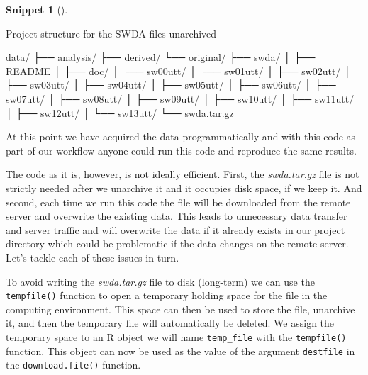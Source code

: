 \documentclass[
  letterpaper,
  krantz1]{latex/krantz-mod}
\newenvironment{Shaded}{\begin{snugshade}}{\end{snugshade}}
\newcommand{\ExtensionTok}[1]{\textcolor[rgb]{0.00,0.00,0.00}{#1}}
\newcommand{\NormalTok}[1]{\textcolor[rgb]{0.00,0.00,0.00}{#1}}
\theoremstyle{definition}
\theoremstyle{definition}
\newtheorem{definition}{Snippet}[chapter]
\theoremstyle{remark}
\begin{document}
\begin{definition}[]\protect\hypertarget{def-acquire-swda-unarchive-location}{}\label{def-acquire-swda-unarchive-location}

Project structure for the SWDA files unarchived

\begin{Shaded}
\begin{Highlighting}[]
\ExtensionTok{data/}
\ExtensionTok{├──}\NormalTok{ analysis/}
\ExtensionTok{├──}\NormalTok{ derived/}
\ExtensionTok{└──}\NormalTok{ original/}
    \ExtensionTok{├──}\NormalTok{ swda/}
    \ExtensionTok{│}\NormalTok{   ├── README}
    \ExtensionTok{│}\NormalTok{   ├── doc/}
    \ExtensionTok{│}\NormalTok{   ├── sw00utt/}
    \ExtensionTok{│}\NormalTok{   ├── sw01utt/}
    \ExtensionTok{│}\NormalTok{   ├── sw02utt/}
    \ExtensionTok{│}\NormalTok{   ├── sw03utt/}
    \ExtensionTok{│}\NormalTok{   ├── sw04utt/}
    \ExtensionTok{│}\NormalTok{   ├── sw05utt/}
    \ExtensionTok{│}\NormalTok{   ├── sw06utt/}
    \ExtensionTok{│}\NormalTok{   ├── sw07utt/}
    \ExtensionTok{│}\NormalTok{   ├── sw08utt/}
    \ExtensionTok{│}\NormalTok{   ├── sw09utt/}
    \ExtensionTok{│}\NormalTok{   ├── sw10utt/}
    \ExtensionTok{│}\NormalTok{   ├── sw11utt/}
    \ExtensionTok{│}\NormalTok{   ├── sw12utt/}
    \ExtensionTok{│}\NormalTok{   └── sw13utt/}
    \ExtensionTok{└──}\NormalTok{ swda.tar.gz}
\end{Highlighting}
\end{Shaded}

\end{definition}

At this point we have acquired the data programmatically and with this
code as part of our workflow anyone could run this code and reproduce
the same results.

The code as it is, however, is not ideally efficient. First, the
\emph{swda.tar.gz} file is not strictly needed after we unarchive it and
it occupies disk space, if we keep it. And second, each time we run this
code the file will be downloaded from the remote server and overwrite
the existing data. This leads to unnecessary data transfer and server
traffic and will overwrite the data if it already exists in our project
directory which could be problematic if the data changes on the remote
server. Let's tackle each of these issues in turn.

To avoid writing the \emph{swda.tar.gz} file to disk (long-term) we can
use the \texttt{tempfile()} function to open a temporary holding space
for the file in the computing environment. This space can then be used
to store the file, unarchive it, and then the temporary file will
automatically be deleted. We assign the temporary space to an R object
we will name \texttt{temp\_file} with the \texttt{tempfile()} function.
This object can now be used as the value of the argument
\texttt{destfile} in the \texttt{download.file()} function.
\end{document}
